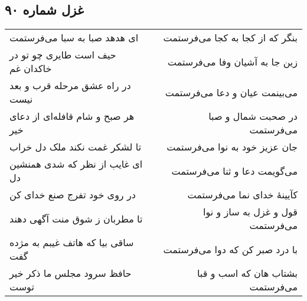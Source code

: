 \begin{center}
\section*{غزل شماره ۹۰}
\label{sec:sh090}
\begin{longtable}{l p{0.5cm} r}
ای هدهد صبا به سبا می‌فرستمت
&&
بنگر که از کجا به کجا می‌فرستمت
\\
حیف است طایری چو تو در خاکدان غم
&&
زین جا به آشیان وفا می‌فرستمت
\\
در راه عشق مرحله قرب و بعد نیست
&&
می‌بینمت عیان و دعا می‌فرستمت
\\
هر صبح و شام قافله‌ای از دعای خیر
&&
در صحبت شمال و صبا می‌فرستمت
\\
تا لشکر غمت نکند ملک دل خراب
&&
جان عزیز خود به نوا می‌فرستمت
\\
ای غایب از نظر که شدی همنشین دل
&&
می‌گویمت دعا و ثنا می‌فرستمت
\\
در روی خود تفرج صنع خدای کن
&&
کآیینهٔ خدای نما می‌فرستمت
\\
تا مطربان ز شوق منت آگهی دهند
&&
قول و غزل به ساز و نوا می‌فرستمت
\\
ساقی بیا که هاتف غیبم به مژده گفت
&&
با درد صبر کن که دوا می‌فرستمت
\\
حافظ سرود مجلس ما ذکر خیر توست
&&
بشتاب هان که اسب و قبا می‌فرستمت
\\
\end{longtable}
\end{center}

